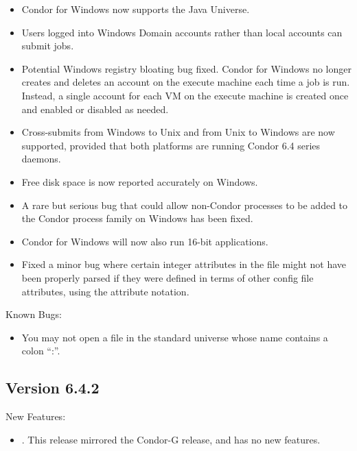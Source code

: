 \begin{itemize}
\item Condor for Windows now supports the Java Universe.

\item Users logged into Windows Domain accounts rather than local accounts
can submit jobs.

\item Potential Windows registry bloating bug fixed. Condor for Windows no
longer creates and deletes an account on the execute machine each time a
job is run. Instead, a single account for each VM on the execute machine is
created once and enabled or disabled as needed.

\item Cross-submits from Windows to Unix and from Unix to Windows are now
supported, provided that both platforms are running Condor 6.4 series daemons.

\item Free disk space is now reported accurately on Windows.

\item A rare but serious bug that could allow non-Condor processes to be added
to the Condor process family on Windows has been fixed.

\item Condor for Windows will now also run 16-bit applications.

\item Fixed a minor bug where certain integer attributes in the
 file might not have been properly parsed if they
were defined in terms of other config file attributes, using the
attribute notation.  

\end{itemize}

\noindent Known Bugs:
\begin{itemize}

\item You may not open a file in the standard universe whose name contains a
colon ``:''.

\end{itemize}

\subsection{\label{sec:New-6-4-2}Version 6.4.2}
\noindent New Features:
\begin{itemize}

\item. This release mirrored the Condor-G release, and has no new features.

\end{itemize}

